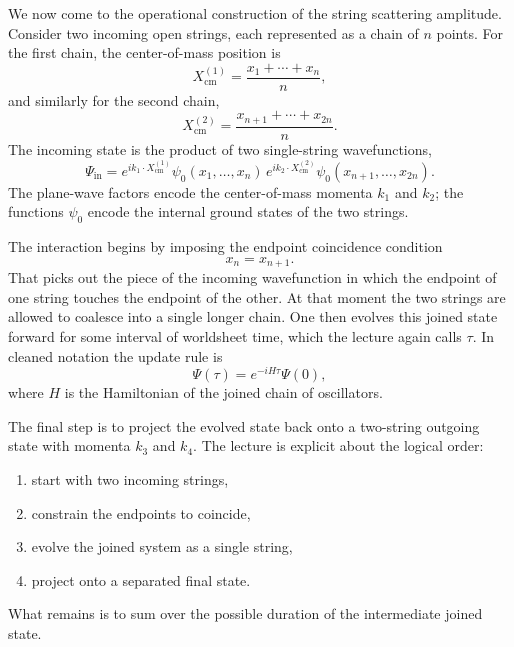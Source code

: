 We now come to the operational construction of the string scattering amplitude. Consider two incoming open strings, each represented as a chain of \(n\) points. For the first chain, the center-of-mass position is
\begin{equation}
X_{\mathrm{cm}}^{(1)}=\frac{x_1+\cdots+x_n}{n},
\end{equation}
and similarly for the second chain,
\begin{equation}
X_{\mathrm{cm}}^{(2)}=\frac{x_{n+1}+\cdots+x_{2n}}{n}.
\end{equation}
The incoming state is the product of two single-string wavefunctions,
\begin{equation}
\Psi_{\mathrm{in}}
=
e^{ik_1\cdot X_{\mathrm{cm}}^{(1)}}\psi_0(x_1,\dots,x_n)\,
e^{ik_2\cdot X_{\mathrm{cm}}^{(2)}}\psi_0(x_{n+1},\dots,x_{2n}).
\end{equation}
The plane-wave factors encode the center-of-mass momenta \(k_1\) and \(k_2\); the functions \(\psi_0\) encode the internal ground states of the two strings.

The interaction begins by imposing the endpoint coincidence condition
\begin{equation}
x_n=x_{n+1}.
\end{equation}
That picks out the piece of the incoming wavefunction in which the endpoint of one string touches the endpoint of the other. At that moment the two strings are allowed to coalesce into a single longer chain. One then evolves this joined state forward for some interval of worldsheet time, which the lecture again calls \(\tau\). In cleaned notation the update rule is
\begin{equation}
\Psi(\tau)=e^{-iH\tau}\Psi(0),
\end{equation}
where \(H\) is the Hamiltonian of the joined chain of oscillators.

The final step is to project the evolved state back onto a two-string outgoing state with momenta \(k_3\) and \(k_4\). The lecture is explicit about the logical order:
\begin{enumerate}
\item start with two incoming strings,
\item constrain the endpoints to coincide,
\item evolve the joined system as a single string,
\item project onto a separated final state.
\end{enumerate}
What remains is to sum over the possible duration of the intermediate joined state.

